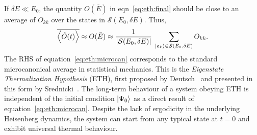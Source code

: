 \documentclass[%
reprint,
superscriptaddress,
amsmath,amssymb,
aps,
prb,
]{revtex4-2}
\begin{document}
	If $\delta E \ll E_0$, the quantity $O(\bar{E})$ in eqn~\ref{eq:eth:final} should be close to an average of $O_{kk}$ over the states in $\mathcal{S}(E_0, \delta E)$. Thus,
	\begin{equation}
		\label{eq:eth:microcan}
	\overline{\ev{\hat{O}(t)}} \approx O(\bar{E})\approx \frac{1}{\left\vert\mathcal{S}(E_0, \delta E) \right\vert}\;\sum_{\ket{e_k}\in \mathcal{S}(E_0, \delta E)} O_{kk}.
	\end{equation}
The RHS of equation~\ref{eq:eth:microcan} corresponds to the standard microcanonical average in statistical mechanics. This is the \textit{Eigenstate Thermalization Hypothesis} (ETH), first proposed by Deutsch~\cite{Deutsch1991} and presented in this form by Srednicki~\cite{Srednicki1994}. The long-term behaviour of a system obeying ETH is independent of the initial condition $\ket{\Psi_0}$ as a direct result of equation~\ref{eq:eth:microcan}. Despite the lack of ergodicity in the underlying Heisenberg dynamics, the system can start from any typical state at $t=0$ and exhibit universal thermal behaviour.
\end{document}
